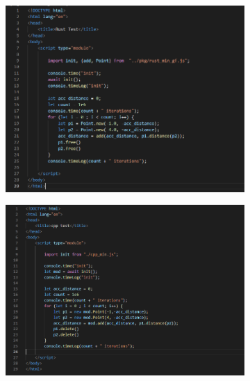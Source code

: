 \begin{figure}
  \centering
  \begin{subfigure}[b]{0.32\linewidth}
    \graphicspath{{../../assets/images/6.1.5/}}
    \centering
    \includegraphics[width=\linewidth]{rust.PNG}
    \caption{}
  \end{subfigure}%
  \qquad %
  \begin{subfigure}[b]{0.32\linewidth}
    \graphicspath{{../../assets/images/6.1.5/}}
    \centering
    \includegraphics[width=\linewidth]{cpp.PNG}
    \caption{}
  \end{subfigure}%
  \qquad
  \begin{subfigure}[b]{0.32\linewidth}
    \graphicspath{{../../assets/images/6.1.5/}}

\end{subfigure}
\end{figure}
